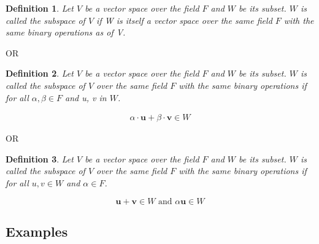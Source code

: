 \documentclass[a4paper, titlepage]{article}
\newtheorem{definition}{Definition}[section]
\begin{document}
\begin{definition}
    \label{subspacedef1}
    Let $V$ be a vector space over the field $F$ and $W$ be its subset. 
    $W$ is called the subspace of $V$ if W is itself a vector space 
    over the same field $F$ with the same binary operations as of V.
\end{definition}
\begin{center}
    OR
\end{center}
\begin{definition}
    \label{subspacedef2}
    Let $V$ be a vector space over the field $F$ and $W$ be its subset. 
    $W$ is called the subspace of $V$ over the same field $F$ with the 
    same binary operations if for all $\alpha, \beta \in F$ and u, v
    in $W$.
\end{definition}
\begin{align*}
    \alpha\cdot\bm{u} + \beta\cdot\bm{v} \in W
\end{align*}
\begin{center}
    OR
\end{center}
\begin{definition}
    \label{subspacedef3}
    Let $V$ be a vector space over the field $F$ and $W$ be its subset. 
    $W$ is called the subspace of $V$ over the same field $F$ with the 
    same binary operations if for all $u, v \in W$ and $\alpha \in F$.
\end{definition}
\[ \bm{u} + \bm{v} \in W \text{ and } \alpha \bm{u} \in W \]
\subsection{Examples}
\end{document}
